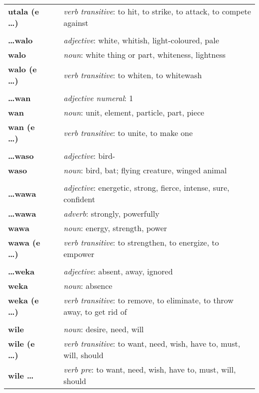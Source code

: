\begin{supertabular}{p{2,5cm}|ll}
\textbf{utala (e \dots)} && \textit{verb transitive}: to hit, to strike, to attack, to compete against \\ 
 && \\ %
\textbf{\dots walo} && \textit{adjective}: white, whitish, light-coloured, pale \\ 
\textbf{walo} && \textit{noun}: white thing or part, whiteness, lightness \\ 
\textbf{walo (e \dots)} && \textit{verb transitive}: to whiten, to whitewash \\ 
 && \\ %
\textbf{\dots wan} && \textit{adjective numeral}: 1 \\ 
\textbf{wan} && \textit{noun}: unit, element, particle, part, piece \\ 
\textbf{wan (e \dots)} && \textit{verb transitive}: to unite, to make one \\ 
 && \\ %
\textbf{\dots waso} && \textit{adjective}: bird- \\ 
\textbf{waso} && \textit{noun}: bird, bat; flying creature, winged animal \\ 
 && \\ %
\textbf{\dots wawa} && \textit{adjective}: energetic, strong, fierce, intense, sure, confident \\ 
\textbf{\dots wawa} && \textit{adverb}: strongly, powerfully \\ 
\textbf{wawa} && \textit{noun}: energy, strength, power \\ 
\textbf{wawa (e \dots)} && \textit{verb transitive}: to strengthen, to energize, to empower \\ 
 && \\ %
\textbf{\dots weka} && \textit{adjective}: absent, away, ignored \\ 
\textbf{weka} && \textit{noun}: absence \\ 
\textbf{weka (e \dots)} && \textit{verb transitive}: to remove, to eliminate, to throw away, to get rid of \\ 
 && \\ %
\textbf{wile} && \textit{noun}: desire, need, will \\ 
\textbf{wile (e \dots)} && \textit{verb transitive}: to want, need, wish, have to, must, will, should \\ 
\textbf{wile \dots} && \textit{verb pre}: to want, need, wish, have to, must, will, should \\ 
\end{supertabular} \\
%
